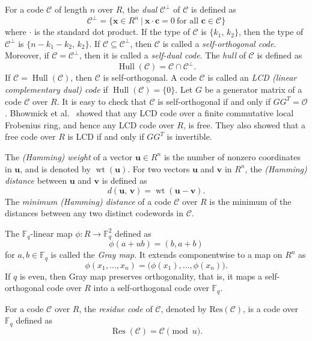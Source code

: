 \documentclass{article}
\theoremstyle{definition}
\theoremstyle{remark}
\begin{document}
For a code $\mathcal{C}$ of length $n$ over $R$, the \textit{dual} $\mathcal{C}^\perp$ of $\mathcal{C}$ is defined as
\[
\mathcal{C}^\perp=\{\mathbf{x}\in R^n~|~\mathbf{x}\cdot \mathbf{c}=0~\mbox{for all }\mathbf{c}\in \mathcal{C}\}
\]
where $\cdot$ is the standard dot product. If the type of $\mathcal{C}$ is $\{k_1,\,k_2\}$, then the type of $\mathcal{C}^\perp$ is $\{n-k_1-k_2,\,k_2\}$. If $\mathcal{C}\subseteq\mathcal{C}^\perp$, then $\mathcal{C}$ is called a \textit{self-orthogonal code}. Moreover, if $\mathcal{C}=\mathcal{C}^\perp$, then it is called a \textit{self-dual code}. The \textit{hull} of $\mathcal{C}$ is defined as
\[
\operatorname{Hull}(\mathcal{C})=\mathcal{C}\cap\mathcal{C}^\perp.
\]
If $\mathcal{C}=\operatorname{Hull}(\mathcal{C})$, then $\mathcal{C}$ is self-orthogonal. A code $\mathcal{C}$ is called an \textit{LCD (linear complementary dual) code} if $\operatorname{Hull}(\mathcal{C})=\{0\}$. Let $G$ be a generator matrix of a code $\mathcal{C}$ over $R$. It is easy to check that $\mathcal{C}$ is self-orthogonal if and only if $GG^T=\mathcal{O}$. Bhowmick et al.~\cite{BFMBB-2020} showed that any LCD code over a finite commutative local Frobenius ring, and hence any LCD code over $R$, is free. They also showed that a free code over $R$ is LCD if and only if $GG^T$ is invertible.

The \textit{(Hamming) weight} of a vector $\mathbf{u}\in R^n$ is the number of nonzero coordinates in $\mathbf{u}$, and is denoted by $\operatorname{wt}(\mathbf{u})$. For two vectors $\mathbf{u}$ and $\mathbf{v}$ in $R^n$, the \textit{(Hamming) distance} between $\mathbf{u}$ and $\mathbf{v}$ is defined as
\[
d(\mathbf{u},\,\mathbf{v})=\operatorname{wt}(\mathbf{u}-\mathbf{v}).
\]
The \textit{minimum (Hamming) distance} of a code $\mathcal{C}$ over $R$ is the minimum of the distances between any two distinct codewords in $\mathcal{C}$.

The $\mathbb{F}_q$-linear map $\phi:R\to \mathbb{F}_q^2$ defined as
\[
\phi(a+ub)=(b, a+b)
\]
for $a, b\in \mathbb{F}_q$ is called the \textit{Gray map}. It extends componentwise to a map on $R^n$ as
\[
\phi(x_1,\ldots,x_n)
=\bigl(\phi(x_1),\ldots,\phi(x_n)\bigr).
\]
If $q$ is even, then Gray map preserves orthogonality, that is, it maps a self-orthogonal code over $R$ into a self-orthogonal code over $\mathbb{F}_q$.

For a code $\mathcal{C}$ over $R$, the \textit{residue code} of $\mathcal{C}$, denoted by $\text{Res}(\mathcal{C})$, is a code over $\mathbb{F}_q$ defined as
\[
\operatorname{Res}(\mathcal{C})=\mathcal{C}\pmod u.
\]
\end{document}
